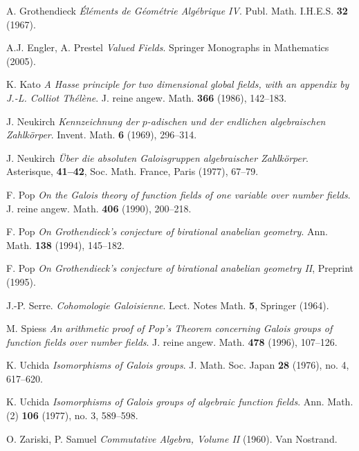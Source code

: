 \begin{thebibliography}{999999}

    A. Grothendieck
    \textit{Éléments de Géométrie Algébrique IV}.
    Publ. Math. I.H.E.S. \textbf{32} (1967).

    A.J. Engler, A. Prestel
    \textit{Valued Fields}.
    Springer Monographs in Mathematics (2005).

    K. Kato
    \textit{A Hasse principle for two dimensional global fields, with an appendix by J.-L. Colliot Thélène}.
    J. reine angew. Math. \textbf{366} (1986), 142\---183.
       
    J. Neukirch
    \textit{Kennzeichnung der $p$-adischen und der endlichen algebraischen Zahlkörper}.
    Invent. Math. \textbf{6} (1969), 296\---314.
    
    J. Neukirch
    \textit{Über die absoluten Galoisgruppen algebraischer Zahlkörper}. Asterisque, \textbf{41\---42}, Soc. Math. France, Paris (1977), 67\---79.
    
    F. Pop
    \textit{On the Galois theory of function fields of one variable over number fields}.
    J. reine angew. Math. \textbf{406} (1990), 200\---218.

    F. Pop
    \textit{On Grothendieck's conjecture of birational anabelian geometry}.
    Ann. Math. \textbf{138} (1994), 145\---182.

    F. Pop
    \textit{On Grothendieck's conjecture of birational anabelian geometry II}, Preprint (1995).
    
    J.-P. Serre.
    \textit{Cohomologie Galoisienne}.
    Lect. Notes Math. \textbf{5}, Springer (1964).
    
	M. Spiess
	\textit{An arithmetic proof of Pop's Theorem concerning Galois groups of function fields over number fields}.
    J. reine angew. Math. \textbf{478} (1996), 107\---126.
   
    K. Uchida
    \textit{Isomorphisms of Galois groups}.
    J. Math. Soc. Japan \textbf{28} (1976), no. 4, 617\---620.

    K. Uchida
    \textit{Isomorphisms of Galois groups of algebraic function fields}.
    Ann. Math. (2) \textbf{106} (1977), no. 3, 589\---598.
  
    O. Zariski, P. Samuel
    \textit{Commutative Algebra, Volume II} (1960). 
    Van Nostrand. 

\end{thebibliography}
